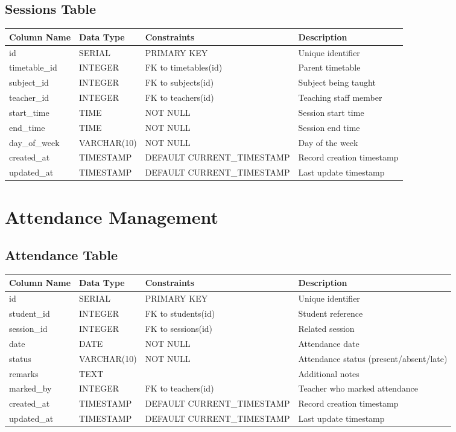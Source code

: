\documentclass[11pt,a4paper]{article}
\begin{document}
\subsection{Sessions Table}
\begin{longtable}{|p{3cm}|p{3cm}|p{2cm}|p{6cm}|}
\hline
\textbf{Column Name} & \textbf{Data Type} & \textbf{Constraints} & \textbf{Description} \\
\hline
\endhead
id & SERIAL & PRIMARY KEY & Unique identifier \\
\hline
timetable\_id & INTEGER & FK to timetables(id) & Parent timetable \\
\hline
subject\_id & INTEGER & FK to subjects(id) & Subject being taught \\
\hline
teacher\_id & INTEGER & FK to teachers(id) & Teaching staff member \\
\hline
start\_time & TIME & NOT NULL & Session start time \\
\hline
end\_time & TIME & NOT NULL & Session end time \\
\hline
day\_of\_week & VARCHAR(10) & NOT NULL & Day of the week \\
\hline
created\_at & TIMESTAMP & DEFAULT CURRENT\_TIMESTAMP & Record creation timestamp \\
\hline
updated\_at & TIMESTAMP & DEFAULT CURRENT\_TIMESTAMP & Last update timestamp \\
\hline
\end{longtable}

\section{Attendance Management}

\subsection{Attendance Table}
\begin{longtable}{|p{3cm}|p{3cm}|p{2cm}|p{6cm}|}
\hline
\textbf{Column Name} & \textbf{Data Type} & \textbf{Constraints} & \textbf{Description} \\
\hline
\endhead
id & SERIAL & PRIMARY KEY & Unique identifier \\
\hline
student\_id & INTEGER & FK to students(id) & Student reference \\
\hline
session\_id & INTEGER & FK to sessions(id) & Related session \\
\hline
date & DATE & NOT NULL & Attendance date \\
\hline
status & VARCHAR(10) & NOT NULL & Attendance status (present/absent/late) \\
\hline
remarks & TEXT & & Additional notes \\
\hline
marked\_by & INTEGER & FK to teachers(id) & Teacher who marked attendance \\
\hline
created\_at & TIMESTAMP & DEFAULT CURRENT\_TIMESTAMP & Record creation timestamp \\
\hline
updated\_at & TIMESTAMP & DEFAULT CURRENT\_TIMESTAMP & Last update timestamp \\
\hline
\end{longtable}
\end{document}
